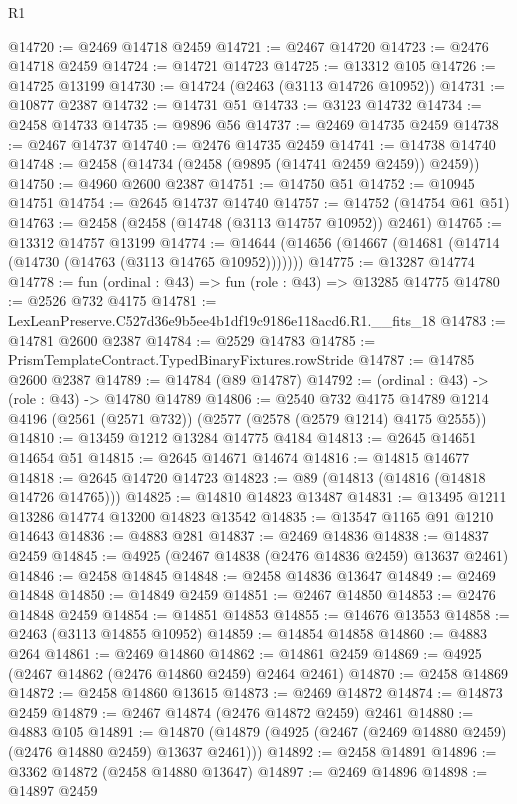 \begin{lexlean}{R1}
\begin{coremodule}
@14720 := @2469 @14718 @2459
@14721 := @2467 @14720
@14723 := @2476 @14718 @2459
@14724 := @14721 @14723
@14725 := @13312 @105
@14726 := @14725 @13199
@14730 := @14724 (@2463 (@3113 @14726 @10952))
@14731 := @10877 @2387
@14732 := @14731 @51
@14733 := @3123 @14732
@14734 := @2458 @14733
@14735 := @9896 @56
@14737 := @2469 @14735 @2459
@14738 := @2467 @14737
@14740 := @2476 @14735 @2459
@14741 := @14738 @14740
@14748 := @2458 (@14734 (@2458 (@9895 (@14741 @2459 @2459)) @2459))
@14750 := @4960 @2600 @2387
@14751 := @14750 @51
@14752 := @10945 @14751
@14754 := @2645 @14737 @14740
@14757 := @14752 (@14754 @61 @51)
@14763 := @2458 (@2458 (@14748 (@3113 @14757 @10952)) @2461)
@14765 := @13312 @14757 @13199
@14774 := @14644 (@14656 (@14667 (@14681 (@14714 (@14730 (@14763 (@3113 @14765 @10952)))))))
@14775 := @13287 @14774
@14778 := fun (ordinal : @43) => fun (role : @43) => @13285 @14775
@14780 := @2526 @732 @4175
@14781 := LexLeanPreserve.C527d36e9b5ee4b1df19c9186e118acd6.R1.__fits_18
@14783 := @14781 @2600 @2387
@14784 := @2529 @14783
@14785 := PrismTemplateContract.TypedBinaryFixtures.rowStride
@14787 := @14785 @2600 @2387
@14789 := @14784 (@89 @14787)
@14792 := (ordinal : @43) -> (role : @43) -> @14780 @14789
@14806 := @2540
    @732
    @4175
    @14789
    @1214
    @4196
    (@2561 (@2571 @732))
    (@2577 (@2578 (@2579 @1214) @4175 @2555))
@14810 := @13459 @1212 @13284 @14775 @4184
@14813 := @2645 @14651 @14654 @51
@14815 := @2645 @14671 @14674
@14816 := @14815 @14677
@14818 := @2645 @14720 @14723
@14823 := @89 (@14813 (@14816 (@14818 @14726 @14765)))
@14825 := @14810 @14823 @13487
@14831 := @13495 @1211 @13286 @14774 @13200 @14823 @13542
@14835 := @13547 @1165 @91 @1210 @14643
@14836 := @4883 @281
@14837 := @2469 @14836
@14838 := @14837 @2459
@14845 := @4925 (@2467 @14838 (@2476 @14836 @2459) @13637 @2461)
@14846 := @2458 @14845
@14848 := @2458 @14836 @13647
@14849 := @2469 @14848
@14850 := @14849 @2459
@14851 := @2467 @14850
@14853 := @2476 @14848 @2459
@14854 := @14851 @14853
@14855 := @14676 @13553
@14858 := @2463 (@3113 @14855 @10952)
@14859 := @14854 @14858
@14860 := @4883 @264
@14861 := @2469 @14860
@14862 := @14861 @2459
@14869 := @4925 (@2467 @14862 (@2476 @14860 @2459) @2464 @2461)
@14870 := @2458 @14869
@14872 := @2458 @14860 @13615
@14873 := @2469 @14872
@14874 := @14873 @2459
@14879 := @2467 @14874 (@2476 @14872 @2459) @2461
@14880 := @4883 @105
@14891 := @14870 (@14879 (@4925 (@2467 (@2469 @14880 @2459) (@2476 @14880 @2459) @13637 @2461)))
@14892 := @2458 @14891
@14896 := @3362 @14872 (@2458 @14880 @13647)
@14897 := @2469 @14896
@14898 := @14897 @2459

\end{coremodule}
\end{lexlean}
